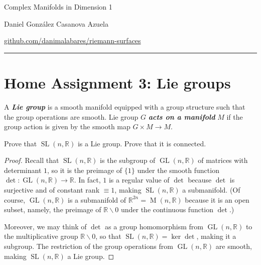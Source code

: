 \documentclass{article}
\numberwithin{equation}{section}
\newcommand{\R}{\mathbb{R}}
\DeclareMathOperator{\GL}{GL}
\DeclareMathOperator{\SL}{SL}
\DeclareMathOperator{\M}{M}
\begin{document}
\begin{minipage}{\textwidth}
	\begin{minipage}{.5\textwidth}
		Complex Manifolds in Dimension 1\\
	\end{minipage}%
	\begin{minipage}{.5\textwidth}
		\raggedleft
		Daniel González Casanova Azuela\par
		{\small\href{https://github.com/danimalabares/riemann-surfaces}{github.com/danimalabares/riemann-surfaces}}
	\end{minipage}%
\end{minipage}\vspace{.2cm}\hrule
\section{Home Assignment 3: Lie groups}
\setcounter{section}{3}
\begin{defn}
	A \textit{\textbf{Lie group}} is a smooth manifold equipped with a group structure such that the group operations are smooth. Lie group $G$ \textbf{\textit{acts on a manifold}} $M$ if the group action is given by the smooth map $G \times M \to M$.
\end{defn}
\begin{exercise}
	Prove that $\SL(n,\R)$ is a Lie group. Prove that it is connected.
\end{exercise}
\begin{proof}
	Recall that $\SL(n,\R)$ is the subgroup of $\GL(n,\R)$ of matrices with determinant $1$, so it is the preimage of $\{1\}$ under the smooth function $\det:\GL(n,\R)\to\R$. In fact, $1$ is a regular value of $\det$ because $\det$ is surjective and of constant rank $\equiv1$, making $\SL(n,\R)$ a submanifold. (Of course, $\GL(n,\R)$ is a submanifold of $\R^{2n}=\M(n,\R)$ because it is an open subset, namely, the preimage of $\R\backslash0$ under the continuous function $\det$.)
	
	Moreover, we may think of $\det$ as a group homomorphism from $\GL(n,\R)$ to the multiplicative group $\R\backslash0$, so that $\SL(n,\R)=\ker\det$, making it a subgroup. The restriction of the group operations from $\GL(n,\R)$ are smooth, making $\SL(n,\R)$ a Lie group.
\end{proof}
\end{document}
